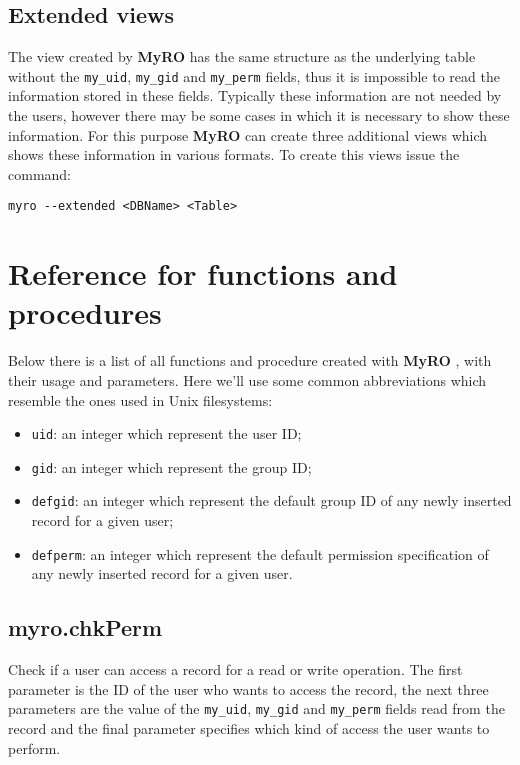 \documentclass[12pt,titlepage]{article}
\newcommand{\myro}{\textbf{MyRO} }
\begin{document}
\subsection{Extended views}
The view created by \myro has the same structure as the underlying
table without the \verb|my_uid|, \verb|my_gid| and \verb|my_perm|
fields, thus it is impossible to read the information stored in these
fields. Typically these information are not needed by the users, however
there may be some cases in which it is necessary to show these
information. For this purpose \myro can create three additional views
which shows these information in various formats. To create this
views issue the command:
%
\begin{verbatim}
myro --extended <DBName> <Table>
\end{verbatim}


\newpage
\section{Reference for functions and procedures}
Below there is a list of all functions and procedure created with
\myro, with their usage and parameters. Here we'll use some common
abbreviations which resemble the ones used in Unix filesystems:

\begin{itemize}
\item \verb|uid|: an integer which represent the user ID;
\item \verb|gid|: an integer which represent the group ID;
\item \verb|defgid|: an integer which represent the default group ID
  of any newly inserted record for a given user;
\item \verb|defperm|: an integer which represent the default
  permission specification of any newly inserted record for a given
  user.
\end{itemize}



\subsection{myro.chkPerm}
Check if a user can access a record for a read or write operation. The
first parameter is the ID of the user who wants to access the
record, the next three parameters are the value of the \verb|my_uid|,
\verb|my_gid| and \verb|my_perm| fields read from the record and the
final parameter specifies which kind of access the user wants to
perform.
\end{document}
